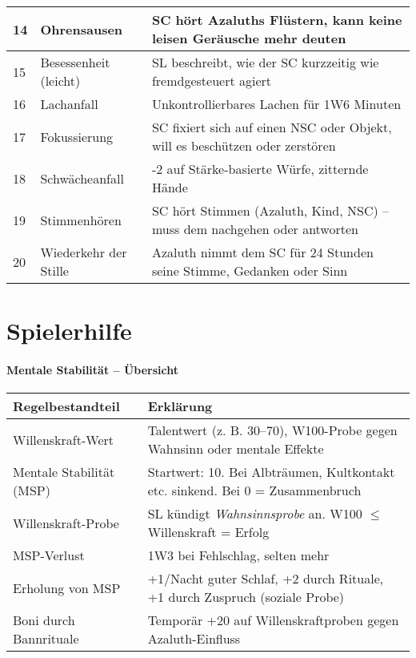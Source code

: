 \begin{small}
\begin{center}
\begin{tabular}{lll}
\midrule 
14 & Ohrensausen & SC hört Azaluths Flüstern, kann keine leisen Geräusche mehr deuten \\ 
\midrule 
15 & Besessenheit (leicht) & SL beschreibt, wie der SC kurzzeitig wie fremdgesteuert agiert \\ 
\midrule 
16 & Lachanfall & Unkontrollierbares Lachen für 1W6 Minuten \\ 
\midrule 
17 & Fokussierung & SC fixiert sich auf einen NSC oder Objekt, will es beschützen oder zerstören \\ 
\midrule 
18 & Schwächeanfall & -2 auf Stärke-basierte Würfe, zitternde Hände \\ 
\midrule 
19 & Stimmenhören & SC hört Stimmen (Azaluth, Kind, NSC) – muss dem nachgehen oder antworten \\ 
\midrule 
20 & Wiederkehr der Stille & Azaluth nimmt dem SC für 24 Stunden seine Stimme, Gedanken oder Sinn \\ 
\bottomrule
\end{tabular} 
\end{center}
\end{small}

\newpage
\section{Spielerhilfe}
\paragraph{Mentale Stabilität – Übersicht}
\begin{center}
\begin{tabular}{ll}
\toprule
\textbf{Regelbestandteil} & \textbf{Erklärung} \\ 
\midrule 
Willenskraft-Wert & Talentwert (z. B. 30–70), W100-Probe gegen Wahnsinn oder mentale Effekte \\ 
\midrule 
Mentale Stabilität (MSP) & Startwert: 10. Bei Albträumen, Kultkontakt etc. sinkend. Bei 0 = Zusammenbruch \\ 
\midrule 
Willenskraft-Probe & SL kündigt \textit{Wahnsinnsprobe} an. W100 $\leq$ Willenskraft = Erfolg \\ 
\midrule 
MSP-Verlust & 1W3 bei Fehlschlag, selten mehr \\ 
\midrule 
Erholung von MSP & +1/Nacht guter Schlaf, +2 durch Rituale, +1 durch Zuspruch (soziale Probe) \\ 
\midrule 
Boni durch Bannrituale & Temporär +20 auf Willenskraftproben gegen Azaluth-Einfluss \\ 
\bottomrule
\end{tabular} 
\end{center}

